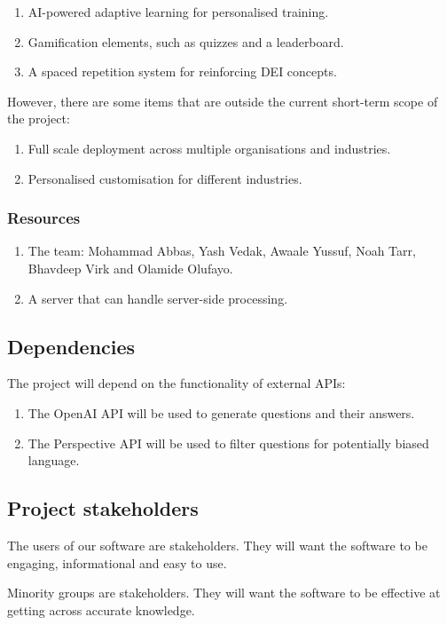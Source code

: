 \documentclass{scrartcl}
\begin{document}
\begin{enumerate}
\item AI-powered adaptive learning for personalised training.
\item Gamification elements, such as quizzes and a leaderboard.
\item A spaced repetition system for reinforcing DEI concepts.
\end{enumerate}

However, there are some items that are outside the current short-term scope of the project:
\begin{enumerate}
\item Full scale deployment across multiple organisations and industries.
\item Personalised customisation for different industries.
\end{enumerate}

\subsubsection{Resources}
\begin{enumerate}
\item The team: Mohammad Abbas, Yash Vedak, Awaale Yussuf, Noah Tarr, Bhavdeep Virk and Olamide Olufayo.
\item A server that can handle server-side processing.
\end{enumerate}

\subsection{Dependencies}
The project will depend on the functionality of external APIs:
\begin{enumerate}
\item The OpenAI API \parencite{openai-api} will be used to generate questions and their answers.
\item The Perspective API \parencite{perspective-api} will be used to filter questions for potentially biased language.
\end{enumerate}

\subsection{Project stakeholders}
The users of our software are stakeholders.
They will want the software to be engaging, informational and easy to use.

\par
Minority groups are stakeholders.
They will want the software to be effective at getting across accurate knowledge.
\end{document}

